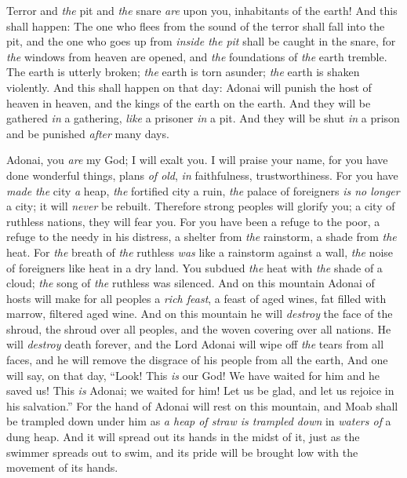 \begin{biblechapter}
\verse Terror and \textit{the} pit and \textit{the} snare \textit{are} upon you, inhabitants of the earth!
\verse And this shall happen:
\verse The one who flees from the sound of the terror shall fall into the pit, 
and the one who goes up from \textit{inside the pit} shall be caught in the snare, 
for \textit{the} windows from heaven are opened, 
and \textit{the} foundations of \textit{the} earth tremble.
\verse The earth is utterly broken; 
\textit{the} earth is torn asunder; 
\textit{the} earth is shaken violently.
\verse And this shall happen on that day:
\verse Adonai will punish the host of heaven in heaven, 
and the kings of the earth on the earth.
\verse And they will be gathered \textit{in} a gathering, \textit{like} a prisoner \textit{in} a pit. 
And they will be shut \textit{in} a prison and be punished \textit{after} many days.
\end{biblechapter}

\begin{biblechapter} %
 Adonai, you \textit{are} my God; I will exalt you. 
I will praise your name, 
for you have done wonderful things, 
plans \textit{of old}, \textit{in} faithfulness, trustworthiness.
\verse For you have \textit{made} \textit{the} city \textit{a} heap, 
\textit{the} fortified city a ruin, 
\textit{the} palace of foreigners \textit{is no longer} a city; 
it will \textit{never} be rebuilt.
\verse Therefore strong peoples will glorify you; 
a city of ruthless nations, they will fear you.
\verse For you have been a refuge to the poor, 
a refuge to the needy in his distress, 
a shelter from \textit{the} rainstorm, 
a shade from \textit{the} heat. 
For \textit{the} breath of \textit{the} ruthless \textit{was} like a rainstorm against a wall,
\verse \textit{the} noise of foreigners like heat in a dry land. 
You subdued \textit{the} heat with \textit{the} shade of a cloud; 
\textit{the} song of \textit{the} ruthless was silenced.
\verse And on this mountain Adonai of hosts will make for all peoples a \textit{rich feast}, 
a feast of aged wines, fat filled with marrow, filtered aged wine.
\verse And on this mountain he will \textit{destroy} the face of the shroud, 
the shroud over all peoples, 
and the woven covering over all nations.
\verse He will \textit{destroy} death forever, 
and the Lord Adonai will wipe off \textit{the} tears from all faces, 
and he will remove the disgrace of his people from all the earth,
\verse And one will say, on that day,
\verse “Look! This \textit{is} our God! We have waited for him and he saved us! 
This \textit{is} Adonai; we waited for him! 
Let us be glad, 
and let us rejoice in his salvation.”
\verse For the hand of Adonai will rest on this mountain, 
and Moab shall be trampled down under him 
as \textit{a heap of straw is trampled down} in \textit{waters of} a dung heap.
\verse And it will spread out its hands in the midst of it, 
just as the swimmer spreads out to swim, 
and its pride will be brought low with the movement of its hands.
\end{biblechapter}

